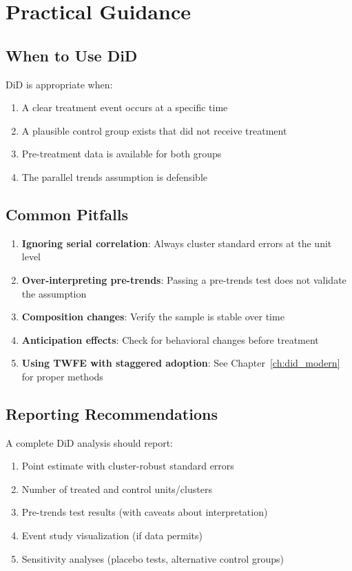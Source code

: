 \section{Practical Guidance}
\label{sec:did_guidance}

\subsection{When to Use DiD}

DiD is appropriate when:
\begin{enumerate}
    \item A clear treatment event occurs at a specific time
    \item A plausible control group exists that did not receive treatment
    \item Pre-treatment data is available for both groups
    \item The parallel trends assumption is defensible
\end{enumerate}

\subsection{Common Pitfalls}

\begin{enumerate}
    \item \textbf{Ignoring serial correlation}: Always cluster standard errors at the unit level
    \item \textbf{Over-interpreting pre-trends}: Passing a pre-trends test does not validate the assumption
    \item \textbf{Composition changes}: Verify the sample is stable over time
    \item \textbf{Anticipation effects}: Check for behavioral changes before treatment
    \item \textbf{Using TWFE with staggered adoption}: See Chapter~\ref{ch:did_modern} for proper methods
\end{enumerate}

\subsection{Reporting Recommendations}

A complete DiD analysis should report:
\begin{enumerate}
    \item Point estimate with cluster-robust standard errors
    \item Number of treated and control units/clusters
    \item Pre-trends test results (with caveats about interpretation)
    \item Event study visualization (if data permits)
    \item Sensitivity analyses (placebo tests, alternative control groups)
\end{enumerate}

